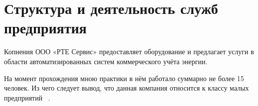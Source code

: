 \section{Структура и деятельность служб предприятия}

Копнения ООО «РТЕ Сервис» предоставляет оборудование и предлагает услуги
в области автоматизированных систем коммерческого учёта энергии.


На момент прохождения мною практики в нём работало суммарно не более 15 человек.
Из чего следует вывод,
что данная компания относится к классу малых предприятий ~\cite{mal-bizner-ru}.

\newpage
